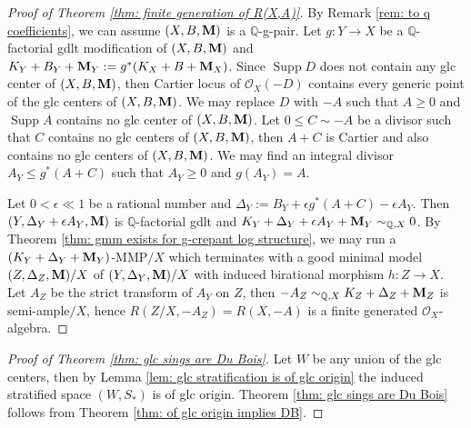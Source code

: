 \documentclass[11pt]{amsart}
\numberwithin{equation}{section}
\newcommand{\Mm}{{\bf{M}}}
\newcommand{\Qq}{\mathbb{Q}}
\newcommand{\Supp}{\operatorname{Supp}}
\newcommand{\Oo}{\mathcal{O}}
\theoremstyle{definition}
\theoremstyle{definition}
\theoremstyle{definition}
\begin{document}
\begin{proof}[Proof of Theorem \ref{thm: finite generation of R(X,A)}]
By Remark \ref{rem: to q coefficients}, we can assume $(X,B,\Mm)$ is a $\Qq$-g-pair. Let $g: Y\rightarrow X$ be a $\mathbb Q$-factorial gdlt modification of $(X,B,\Mm)$ and $K_Y+B_Y+\Mm_Y:=g^*(K_X+B+\Mm_X)$. Since $\Supp D$ does not contain any glc center of $(X,B,\Mm)$, then Cartier locus of $\Oo_X(-D)$ contains every generic point of the glc centers of $(X,B,\Mm)$. We may replace $D$ with $-A$ such that $A\ge 0$ and $\Supp A$ contains no glc center of $(X,B,\Mm)$. Let $0\leq C\sim -A$ be a divisor such that $C$ contains no glc centers of $(X,B,\Mm)$, then $A+C$ is Cartier and also contains no glc centers of $(X,B,\Mm)$. We may find an integral divisor $A_Y\le g^*(A+C)$ such that $A_Y\geq 0$ and $g(A_Y)=A$. 

Let $0<\epsilon\ll 1$ be a rational number and  $\Delta_Y:=B_Y+\epsilon g^*(A+C)-\epsilon A_Y$. Then $(Y,\Delta_Y+\epsilon A_Y,\Mm)$ is $\mathbb Q$-factorial gdlt and $K_Y+\Delta_Y+\epsilon A_Y+\Mm_Y\sim_{\Qq,X}0$. 
By Theorem \ref{thm: gmm exists for g-crepant log structure}, we may run a $(K_Y+\Delta_Y+\Mm_Y)$-MMP$/X$ which terminates with a good minimal model $(Z,\Delta_Z,\Mm)/X$ of $(Y,\Delta_Y,\Mm)/X$ with induced birational morphism $h: Z\rightarrow X$. Let $A_Z$ be the strict transform of $A_Y$ on $Z$, then $-A_Z\sim_{\Qq,X}K_Z+\Delta_Z+\Mm_Z$ is semi-ample$/X$, hence $R(Z/X,-A_Z)=R(X,-A)$ is a finite generated $\Oo_X$-algebra.
\end{proof}

\begin{proof}[Proof of Theorem \ref{thm: glc sings are Du Bois}]
Let $W$ be any union of the glc centers, then by Lemma \ref{lem: glc stratification is of glc origin} the induced stratified space $(W,S_*)$ is of glc origin. Theorem \ref{thm: glc sings are Du Bois} follows from Theorem \ref{thm: of glc origin implies DB}.
\end{proof}
\end{document}
